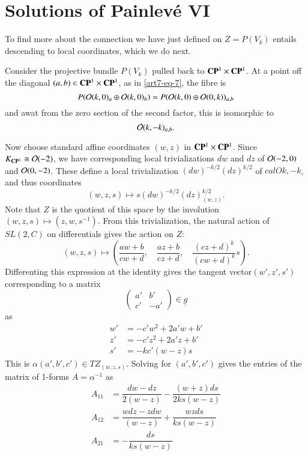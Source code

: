 \section{Solutions of Painlev\'e VI}\label{art7-sec-5}

To find more about the connection we have just defined on $Z=P(V_{k})$ entails descending to local coordinates, which we do next.

Consider the projective bundle $P(V_{k})$ pulled back to $\mathbf{C}\mathbf{P}^{1} \times \mathbf{C}\mathbf{P}^{1}$. At a point off the diagonal $(a, b) \in \mathbf{C}\mathbf{P}^{1} \times \mathbf{C}\mathbf{P}^{1}$, as in \eqref{art7-eq-7}, the fibre is
$$
P(\mathcal{O}(k,0)_{a} \oplus \mathcal{O}(k,0)_{b}) = P(\mathcal{O}(k,0) \oplus \mathcal{O}(0,k))_{a,b}
$$
and awat from the zero section of the second factor, this is isomorphic to
$$
\mathcal{O}(k,-k)_{a,b}.
$$

Now choose standard affine coordinates $(w,z)$ in $\mathbf{C}\mathbf{P}^{1} \times \mathbf{C}\mathbf{P}^{1}$. Since $K_{\mathbf{C}\mathbf{P}^{1}} \cong \mathcal{O} (-2)$, we have corresponding local trivializations $dw$ and $dz$ of $\mathcal{O}(-2, 0)$ and $\mathcal{O}(0, -2)$. These define a local trivialization $(dw)^{-k/2}(dz)^{k/2}$ of $calO{k, -k}$, and thus coordinates
$$
(w, z, s)\mapsto s(dw)^{-k/2}(dz)_{(w,z)}^{k/2}.
$$
Note that $Z$ is the quotient of this space by the involution $(w,z, s) \mapsto (z,w,s^{-1})$. From this trivialization, the natural action of $ SL(2, C)$ on differentials gives the action on $Z$:
$$
(w, z, s) \mapsto \left( \dfrac{aw+b}{cw+d},\quad  \dfrac{az+b}{cz+d},\quad \dfrac{(cz+d)^{k}}{(cw +d)^{k}} s\right).
$$
Differenting this expression at the identity gives the tangent vector\break $(w', z', s')$
corresponding to a matrix
$$
\left(
\begin{matrix}
a' & b'\\
c' & -a'
\end{matrix}
\right)
\in \underline{g}
$$
as
\begin{align*}
w' &= -c'w^{2} +2a'w +b'\\
z'&= -c'z^{2} + 2a'z +b'\\
s' &= -kc'(w-z)s
\end{align*}
This is $\alpha(a',b', c') \in TZ_{(w,z,s)}$. Solving for $(a',b',c')$ gives the entries of the matrix of 1-forms $A=\alpha^{-1}$ as 
\begin{align}\label{art7-eq-12}
A_{11} &= \dfrac{dw-dz}{2(w-z)} - \dfrac{(w+z)ds}{2ks(w-z)} \nonumber\\
A_{12} &= \dfrac{wdz-zdw}{(w-z)} + \dfrac{wzds}{ks(w-z)}\\
A_{21} &= -\dfrac{ds}{ks(w-z)}\nonumber
\end{align}

